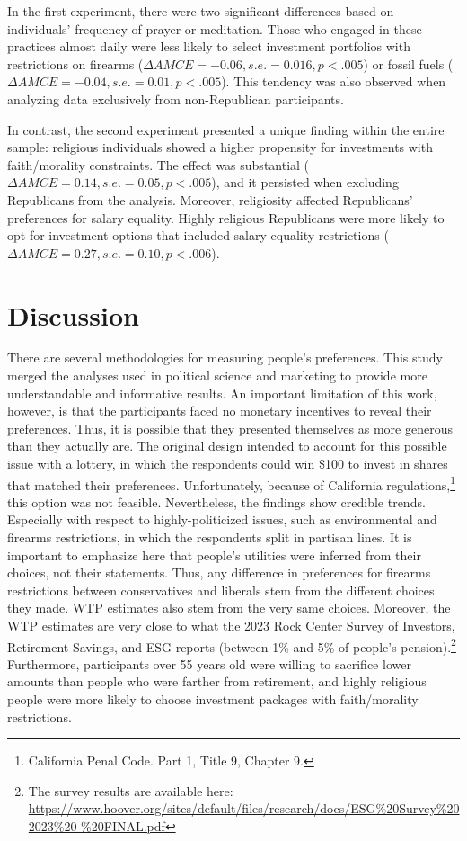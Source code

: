 \documentclass[
  12pt,
]{article}
\begin{document}
In the first experiment, there were two significant differences based on individuals' frequency of prayer or meditation. Those who engaged in these practices almost daily were less likely to select investment portfolios with restrictions on firearms (\(\Delta AMCE = -0.06, s.e. = 0.016, p<.005\)) or fossil fuels (\(\Delta AMCE = -0.04, s.e. = 0.01, p<.005\)). This tendency was also observed when analyzing data exclusively from non-Republican participants.

In contrast, the second experiment presented a unique finding within the entire sample: religious individuals showed a higher propensity for investments with faith/morality constraints. The effect was substantial (\(\Delta AMCE = 0.14, s.e. = 0.05, p<.005\)), and it persisted when excluding Republicans from the analysis. Moreover, religiosity affected Republicans' preferences for salary equality. Highly religious Republicans were more likely to opt for investment options that included salary equality restrictions (\(\Delta AMCE = 0.27, s.e.=0.10, p<.006\)).

\hypertarget{discussion}{%
\section{Discussion}\label{discussion}}

There are several methodologies for measuring people's preferences. This study merged the analyses used in political science and marketing to provide more understandable and informative results. An important limitation of this work, however, is that the participants faced no monetary incentives to reveal their preferences. Thus, it is possible that they presented themselves as more generous than they actually are. The original design intended to account for this possible issue with a lottery, in which the respondents could win \$100 to invest in shares that matched their preferences. Unfortunately, because of California regulations,\footnote{California Penal Code. Part 1, Title 9, Chapter 9.} this option was not feasible. Nevertheless, the findings show credible trends. Especially with respect to highly-politicized issues, such as environmental and firearms restrictions, in which the respondents split in partisan lines. It is important to emphasize here that people's utilities were inferred from their choices, not their statements. Thus, any difference in preferences for firearms restrictions between conservatives and liberals stem from the different choices they made. WTP estimates also stem from the very same choices. Moreover, the WTP estimates are very close to what the 2023 Rock Center Survey of Investors, Retirement Savings, and ESG reports (between 1\% and 5\% of people's pension).\footnote{The survey results are available here: \url{https://www.hoover.org/sites/default/files/research/docs/ESG\%20Survey\%202023\%20-\%20FINAL.pdf}} Furthermore, participants over 55 years old were willing to sacrifice lower amounts than people who were farther from retirement, and highly religious people were more likely to choose investment packages with faith/morality restrictions.
\end{document}
